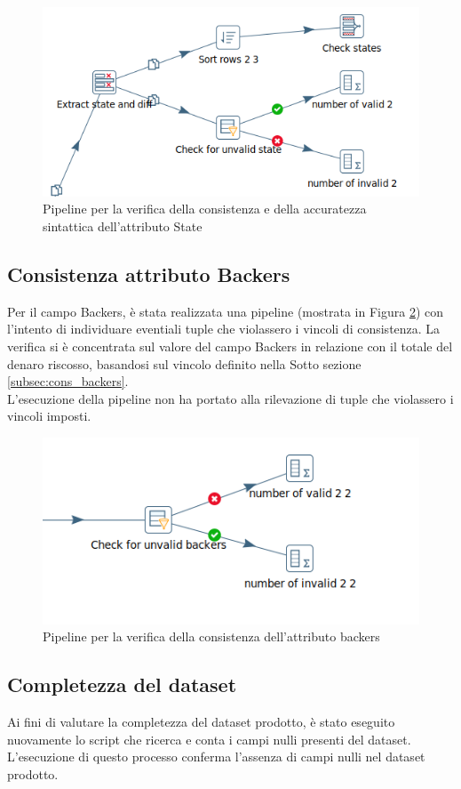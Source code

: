 \begin{figure}[h!]
	\centering
	\includegraphics[width=0.6\linewidth]{images/DQT_state}
	\caption{Pipeline per la verifica della consistenza e della accuratezza sintattica dell'attributo State}
	\label{fig:dqtstate}
\end{figure}

\subsection{Consistenza attributo Backers}
Per il campo Backers, è stata realizzata una pipeline (mostrata in Figura \ref{fig:dqtbackers}) con l'intento di individuare eventiali tuple che violassero i vincoli di consistenza. La verifica si è concentrata sul valore del campo Backers in relazione con il totale del denaro riscosso, basandosi sul vincolo definito nella Sotto sezione \ref{subsec:cons_backers}.\\
L'esecuzione della pipeline non ha portato alla rilevazione di tuple che violassero i vincoli imposti.

\begin{figure}[h!]
	\centering
	\includegraphics[width=0.7\linewidth]{images/DQT_backers}
	\caption{Pipeline per la verifica della consistenza dell'attributo backers}
	\label{fig:dqtbackers}
\end{figure}

\subsection{Completezza del dataset}
Ai fini di valutare la completezza del dataset prodotto, è stato eseguito nuovamente lo script che ricerca e conta i campi nulli presenti del dataset. L'esecuzione di questo processo conferma l'assenza di campi nulli nel dataset prodotto.

